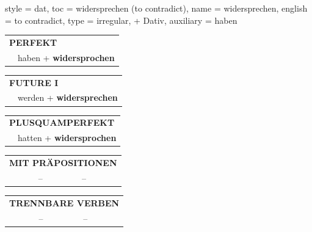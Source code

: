 \begin{verbentry}{
  style = {dat},
  toc = {widersprechen (to contradict)},
  name = {widersprechen},
  english = {to contradict},
  type = {irregular, + Dativ},
  auxiliary = {haben}
}
 \begin{tabular}{rl}
     \multicolumn{2}{l}{\textbf{PERFEKT}}\\
   & haben + \textbf{widersprochen}\\
  \end{tabular}
\hfill
   \begin{tabular}{rl}
   
    \multicolumn{2}{l}{\textbf{FUTURE I} }\\
   & werden + \textbf{widersprechen}\\
 
  \end{tabular}
\hfill
   \begin{tabular}{rl}
      \multicolumn{2}{l}{\textbf{PLUSQUAMPERFEKT}}\\
   & hatten + \textbf{widersprochen}\\
  \end{tabular}

   \vspace{10pt}

   \begin{tabular}{lll}
      \multicolumn{3}{l}{\textbf{MIT PRÄPOSITIONEN}}\\
 & -- & --\\
\end{tabular}
  \hfill
   \begin{tabular}{lll}
      \multicolumn{3}{l}{\textbf{TRENNBARE VERBEN}}\\
 & -- & --\\
  \end{tabular}


  \vspace{-5pt}
\end{verbentry}

